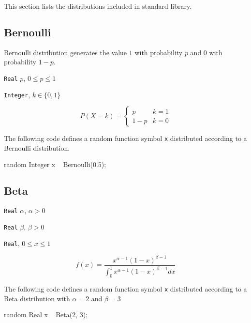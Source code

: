 This section lists the distributions included in \bl standard library.


\subsection{Bernoulli}
Bernoulli distribution generates the value $1$ with probability $p$ and $0$ with probability $1-p$.

\begin{itemize*}
\item[] \verb|Real|
 $p$, $0 \leq p \leq 1$
\end{itemize*}

\begin{itemize*}
\item[] \verb|Integer|, $k \in \{0, 1\}$
\end{itemize*}

\[
	P(X = k) = \left\{
	  \begin{array}{lr}
	    p &    k = 1 \\
	    1-p &  k = 0
	  \end{array}
	\right.
\]

The following code defines a random function symbol \verb|x| distributed according to a Bernoulli distribution.
\begin{blogcode}
random Integer x ~ Bernoulli(0.5);
\end{blogcode}

\subsection{Beta}

\begin{itemize*}
\item[] \verb|Real| $\alpha$, $\alpha > 0$
\item[] \verb|Real| $\beta$, $\beta > 0$
\end{itemize*}

\begin{itemize*}
\item[]
\verb|Real|, $0 \leq x \leq 1$
\end{itemize*}

\[
	f(x) = \frac{x^{\alpha - 1} (1-x)^{\beta - 1}}{\int_{0}^{1} x^{\alpha - 1} (1-x)^{\beta - 1} dx}
\]

The following code defines a random function symbol \verb|x| distributed according to a Beta distribution with $\alpha = 2$ and $\beta = 3$
\begin{blogcode}
random Real x ~ Beta(2, 3);
\end{blogcode}


